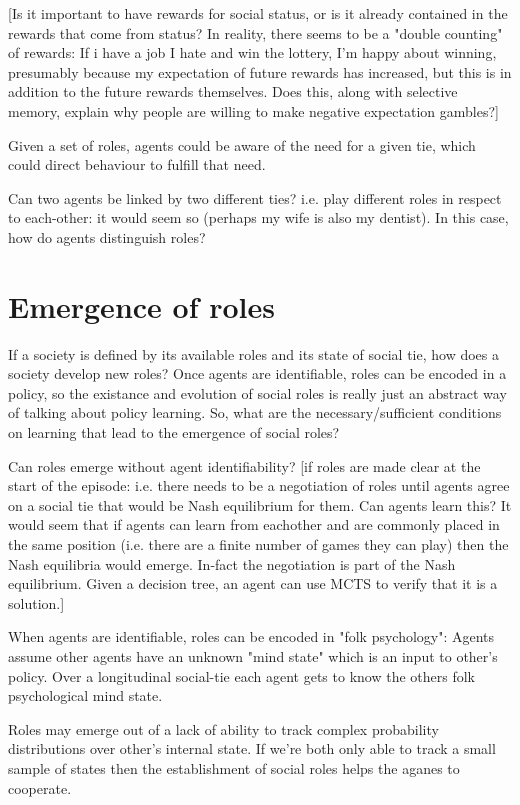 \documentclass[a4paper]{article}
\begin{document}
[Is it important to have rewards for social status, or is it already contained in the rewards that come from status? In reality, there seems to be a "double counting" of rewards: If i have a job I hate and win the lottery, I'm happy about winning, presumably because my expectation of future rewards has increased, but this is in addition to the future rewards themselves. Does this, along with selective memory, explain why people are willing to make negative expectation gambles?]

Given a set of roles, agents could be aware of the need for a given tie, which could direct behaviour to fulfill that need.

Can two agents be linked by two different ties? i.e. play different roles in respect to each-other: it would seem so (perhaps my wife is also my dentist). In this case, how do agents distinguish roles?

\section{Emergence of roles}

If a society is defined by its available roles and its state of social tie, how does a society develop new roles? Once agents are identifiable, roles can be encoded in a policy, so the existance and evolution of social roles is really just an abstract way of talking about policy learning. So, what are the necessary/sufficient conditions on learning that lead to the emergence of social roles?

Can roles emerge without agent identifiability? [if roles are made clear at the start of the episode: i.e. there needs to be a negotiation of roles until agents agree on a social tie that would be Nash equilibrium for them. Can agents learn this? It would seem that if agents can learn from eachother and are commonly placed in the same position (i.e. there are a finite number of games they can play) then the Nash equilibria would emerge. In-fact the negotiation is part of the Nash equilibrium. Given a decision tree, an agent can use MCTS to verify that it is a solution.]

When agents are identifiable, roles can be encoded in "folk psychology": Agents assume other agents have an unknown "mind state" which is an input to other's policy. Over a longitudinal social-tie each agent gets to know the others folk psychological mind state.

Roles may emerge out of a lack of ability to track complex probability distributions over other's internal state. If we're both only able to track a small sample of states then the establishment of social roles helps the aganes to cooperate.
\end{document}
